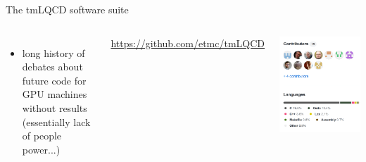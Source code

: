 \documentclass[xcolor={dvipsnames,table}]{beamer}
\begin{document}
\begin{frame}{The tmLQCD software suite}
\begin{columns}
\begin{itemize}
\begin{itemize}
        \end{itemize}
        \vspace{0.15cm}
        \item long history of debates about future code for GPU machines without results (essentially lack of people power...)
      \end{itemize}
      \centering
      \begin{hpcablock}{}
        \centering
        \textcolor{blue}{\href{https://github.com/etmc/tmLQCD}{https://github.com/etmc/tmLQCD}}
      \end{hpcablock}
      \includegraphics[width=\textwidth]{tmlqcd_contributors.png}
  \end{columns}
\end{frame}
\end{document}
